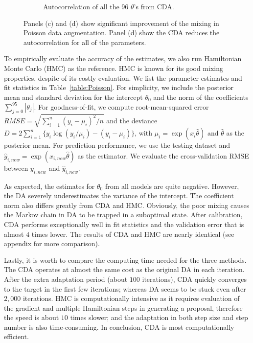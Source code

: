 \documentclass[10pt]{article}
\begin{document}
\begin{figure}[H]
\begin{subfigure}[b]{0.45\textwidth}
 \caption{Autocorrelation of all the 96 $\theta$'s from CDA.}
   \label{acf_poi_ada}
 \end{subfigure}
 \caption{Panels (c) and (d) show significant improvement of the mixing in Poisson data augmentation. Panel (d) show the CDA reduces the autocorrelation for all of the parameters.}
 \label{data_poisson}
 \end{figure}


To empirically evaluate the accuracy of the estimates, we also run Hamiltonian Monte Carlo (HMC) as the reference. HMC is known for its good mixing properties, despite of its costly evaluation. We list the parameter estimates and fit statistics in Table~\ref{table:Poisson}. For simplicity, we include the posterior mean and standard deviation for the intercept $\theta_0$ and the norm of the coefficients $\sum_{j=0}^{95} |\theta_j|$. For goodness-of-fit, we compute root-mean-squared error $RMSE= \sqrt{ \sum_{i=1}^n  (y_i-\mu_i)^2/n}$ and the deviance $D=2\sum_{i=1}^n \{ y_i \log(y_i/\mu_i) -(y_i-\mu_i)\}$, with $\mu_i=\exp( x_i{\hat\theta})$ and ${\hat\theta}$ as the posterior mean. For prediction performance, we use the testing dataset and $\hat y_{i,new}=\exp( x_{i,new}{\hat\theta})$ as the estimator. We evaluate the cross-validation RMSE between $y_{i,new}$ and $\hat y_{i,new}$.

As expected, the estimates for $\theta_0$ from all models are quite negative. However, the DA severely underestimates the variance of the intercept. The coefficient norm also differs greatly from CDA and HMC. Obviously, the poor mixing causes the Markov chain in DA to be trapped in a suboptimal state. After calibration, CDA performs exceptionally well in fit statistics and the validation error that is almost $4$ times lower. The results of CDA and HMC are nearly identical (see appendix for more comparison).

Lastly, it is worth to compare the computing time needed for the three methods. The CDA operates at almost the same cost as the original DA in each iteration. After the extra adaptation period (about $100$ iterations), CDA quickly converges to the target in the first few iterations; whereas DA seems to be stuck even after $2,000$ iterations. HMC is computationally intensive as it requires evaluation of the gradient and multiple Hamiltonian steps in generating a proposal, therefore the speed is about $10$ times slower; and the adaptation in both step size and step number is also time-consuming. In conclusion, CDA is most computationally efficient.
\end{document}
